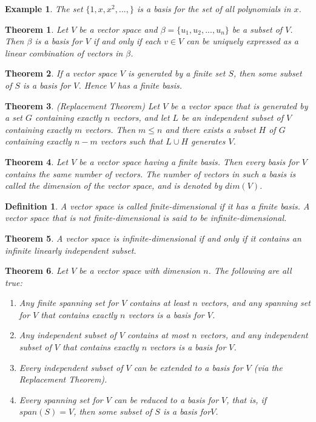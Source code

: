 \documentclass[a4paper]{article}
\newtheorem{mytheorem}{Theorem}
\newtheorem{example}{Example}
\newtheorem{mydef}{Definition}
\numberwithin{mytheorem}{section}
\numberwithin{mydef}{section}
\numberwithin{example}{section}
\begin{document}
\begin{example} The set $\{ 1,x,x^{2},..., \} $ is a basis for the set of all polynomials in $x$.
\end{example}

\begin{mytheorem} Let $V$ be a vector space and $\beta = \{ u_{1},u_{2},...,u_{n} \} $ be a subset of $V$. Then $\beta$ is a basis for $V$ if and only if each $v \in V$ can be uniquely expressed as a linear combination of vectors in $\beta$. 
\end{mytheorem}

\begin{mytheorem} If a vector space $V$ is generated by a finite set $S$, then some subset of $S$ is a basis for $V$. Hence $V$ has a finite basis.
\end{mytheorem}

\begin{mytheorem} (Replacement Theorem) Let $V$ be a vector space that is generated by a set $G$ containing exactly $n$ vectors, and let $L$ be an independent subset of $V$ containing exactly $m$ vectors. Then $m \leq n$ and there exists a subset $H$ of $G$ containing exactly $n - m$ vectors such that $L \cup H$ generates $V$.
\end{mytheorem}

\begin{mytheorem} Let $V$ be a vector space having a finite basis. Then every basis for $V$ contains the same number of vectors. The number of vectors in such a basis is called the dimension of the vector space, and is denoted by $dim(V)$.
\end{mytheorem}

\begin{mydef} A vector space is called finite-dimensional if it has a finite basis. A vector space that is not finite-dimensional is said to be infinite-dimensional.
\end{mydef}

\begin{mytheorem} A vector space is infinite-dimensional if and only if it contains an infinite linearly independent subset.
\end{mytheorem}

\begin{mytheorem} Let $V$ be a vector space with dimension $n$. The following are all true:
\begin{enumerate}
\item Any finite spanning set for $V$ contains at least $n$ vectors, and any spanning set for $V$ that contains exactly $n$ vectors is a basis for $V$.
\item Any independent subset of $V$ contains at most $n$ vectors, and any independent subset of $V$ that contains exactly $n$ vectors is a basis for $V$.
\item Every independent subset of $V$ can be extended to a basis for $V$ (via the Replacement Theorem).
\item Every spanning set for $V$ can be reduced to a basis for $V$, that is, if $span(S)=V$, then some subset of $S$ is a basis for$V$.
\end{enumerate}
\end{mytheorem}
\end{document}
